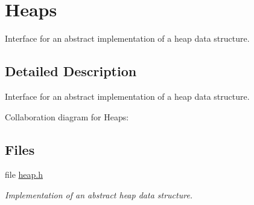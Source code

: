 \hypertarget{group__heap__utils}{}\section{Heaps}
\label{group__heap__utils}


Interface for an abstract implementation of a heap data structure.  




\subsection{Detailed Description}
Interface for an abstract implementation of a heap data structure. 

Collaboration diagram for Heaps\+:
\subsection*{Files}
\begin{DoxyCompactItemize}
\item 
file \mbox{\hyperlink{heap_8h}{heap.\+h}}
\begin{DoxyCompactList}\small\item\em Implementation of an abstract heap data structure. \end{DoxyCompactList}\end{DoxyCompactItemize}
